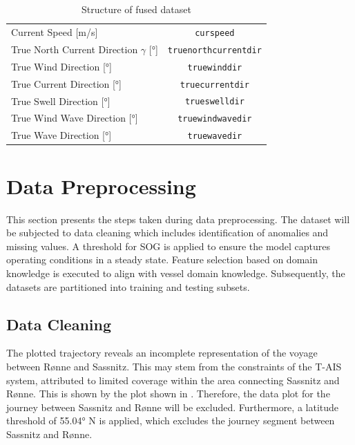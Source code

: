 \begin{table}[h!]
{\begin{tabular}{ p{} c }
    Current Speed [m/s] & {\tt curspeed} \\
    True North Current Direction $\gamma$ [°] & {\tt truenorthcurrentdir}\\
    True Wind Direction [°] & {\tt truewinddir}  \\
    True Current Direction [°] & {\tt truecurrentdir} \\
    True Swell Direction [°] & {\tt trueswelldir} \\
    True Wind Wave Direction [°] & {\tt truewindwavedir} \\
    True Wave Direction [°] & {\tt truewavedir} \\
    \hline
    \end{tabular}}
\caption{Structure of fused dataset}\label{tbl:dataset_init_struct}
\end{table}

\section{Data Preprocessing}\label{sec:data_prep}

This section presents the steps taken during data preprocessing. The dataset will be subjected to data cleaning which includes identification of anomalies and missing values. A threshold for SOG is applied to ensure the model captures operating conditions in a steady state. Feature selection based on domain knowledge is executed to align with vessel domain knowledge. Subsequently, the datasets are partitioned into training and testing subsets.

\subsection{Data Cleaning}\label{sec:data_cleaning}

The plotted trajectory reveals an incomplete representation of the voyage between R{\o}nne and Sassnitz. This may stem from the constraints of the T-AIS system, attributed to limited coverage within the area connecting Sassnitz and R{\o}nne. This is shown by the plot shown in . Therefore, the data plot for the journey between Sassnitz and R{\o}nne will be excluded. Furthermore, a latitude threshold of 55.04° N is applied, which excludes the journey segment between Sassnitz and R{\o}nne.\\

